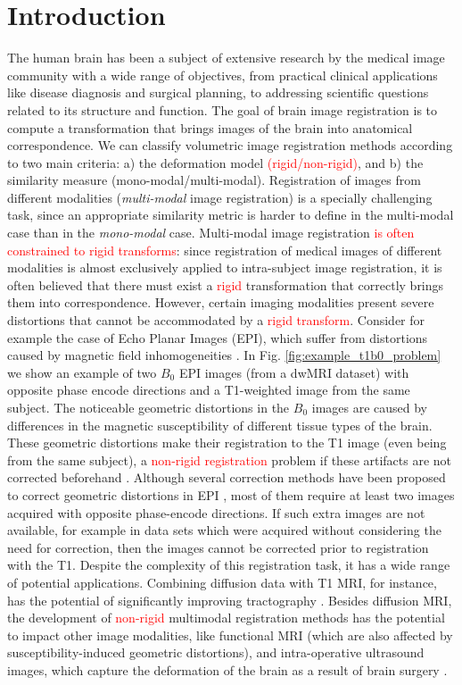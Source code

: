 \vspace{-0.5cm}
\section{Introduction}
The human brain has been a subject of extensive research by the medical image community with a wide range of objectives, from practical clinical applications like disease diagnosis and surgical planning, to addressing scientific questions related to its structure and function. The goal of brain image registration is to compute a transformation that brings images of the brain into anatomical correspondence. We can classify volumetric image registration methods according to two main criteria: a) the deformation model \textcolor{red}{(rigid/non-rigid)}, and b) the similarity measure (mono-modal/multi-modal). Registration of images from different modalities (\emph{multi-modal} image registration) is a specially challenging task, since an appropriate similarity metric is harder to define in the multi-modal case than in the \emph{mono-modal} case. Multi-modal image registration \textcolor{red}{is often constrained to rigid transforms}: since registration of medical images of different modalities is almost exclusively applied to intra-subject image registration, it is often believed that there must exist a \textcolor{red}{rigid} transformation that correctly brings them into correspondence. However, certain imaging modalities present severe distortions that cannot be accommodated by a \textcolor{red}{rigid transform}. Consider for example the case of Echo Planar Images (EPI), which suffer from distortions caused by magnetic field inhomogeneities \cite{Tournier2011, Andersson2003}. In Fig. \ref{fig:example_t1b0_problem} we show an example of two $B_{0}$ EPI images (from a dwMRI dataset) with opposite phase encode directions and a T1-weighted image from the same subject. The noticeable geometric distortions in the $B_{0}$ images are caused by differences in the magnetic susceptibility of different tissue types of the brain. These geometric distortions make their registration to the T1 image (even being from the same subject), a \textcolor{red}{non-rigid registration} problem if these artifacts are not corrected beforehand \cite{Bhushan2015}. Although several correction methods have been proposed to correct geometric distortions in EPI \cite{Andersson2003, Holland2010, Ruthotto, Irfanoglu2015}, most of them require at least two images acquired with opposite phase-encode directions. If such extra images are not available, for example in data sets which were acquired without considering the need for correction, then the images cannot be corrected prior to registration with the T1. Despite the complexity of this registration task, it has a wide range of potential applications. Combining diffusion data with T1 MRI, for instance, has the potential of significantly improving tractography \cite{Smith2012, Girard2014}. Besides diffusion MRI, the development of \textcolor{red}{non-rigid} multimodal registration methods has the potential to impact other image modalities, like functional MRI (which are also affected by susceptibility-induced geometric distortions), and intra-operative ultrasound images, which capture the deformation of the brain as a result of brain surgery \cite{Rivaz2015, DeNigris2012}.

